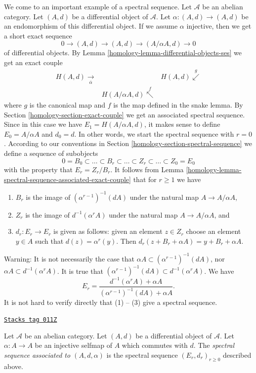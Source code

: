 We come to an important example of a spectral sequence.
Let $\mathcal{A}$ be an abelian category.
Let $(A, d)$ be a differential object of $\mathcal{A}$.
Let $\alpha : (A, d) \to (A, d)$ be an endomorphism of this differential
object. If we assume $\alpha$ injective, then we get a short exact sequence
$$
0 \to (A, d) \to (A, d) \to (A/\alpha A, d) \to 0
$$
of differential objects. By
Lemma \ref{homology-lemma-differential-objects-ses} we get an exact couple
$$
\begin{array}{ccc}H(A, d) \underset{\overline{\alpha}}{\longrightarrow} &  & H(A, d) \overset{g}{\swarrow} \\  & H(A/\alpha A, d) \overset{f}{\nwarrow} & \end{array}
$$
where $g$ is the canonical map and $f$ is the map defined in the snake lemma.
By Section \ref{homology-section-exact-couple} we get an associated spectral sequence.
Since in this case we have $E_1 = H(A/\alpha A, d)$,
it makes sense to define $E_0 = A/\alpha A$ and $d_0 = d$.
In other words, we start the spectral sequence
with $r = 0$. According to our conventions in
Section \ref{homology-section-spectral-sequence} we define a sequence of subobjects
$$
0 = B_0 \subset \ldots \subset B_r \subset \ldots
\subset Z_r \subset \ldots \subset Z_0 = E_0
$$
with the property that $E_r = Z_r/B_r$. It follows from
Lemma \ref{homology-lemma-spectral-sequence-associated-exact-couple}
that for $r \geq 1$ we have
\begin{enumerate}
\item $B_r$ is the image of $(\alpha^{r - 1})^{-1}(d A)$
under the natural map $A \to A/\alpha A$,
\item $Z_r$ is the image of $d^{-1}(\alpha^r A)$
under the natural map $A \to A/\alpha A$, and
\item $d_r : E_r \to E_r$ is given as follows: given an element $z \in Z_r$
choose an element $y \in A$ such that $d(z) = \alpha^r(y)$. Then
$d_r(z + B_r + \alpha A) = y + B_r + \alpha A$.
\end{enumerate}
Warning: It is not necessarily the case that
$\alpha A \subset (\alpha^{r - 1})^{-1}(dA)$, nor
$\alpha A \subset d^{-1}(\alpha^r A)$. It is true that
$(\alpha^{r - 1})^{-1}(dA) \subset d^{-1}(\alpha^r A)$.
We have
$$
E_r
=
\frac{d^{-1}(\alpha^r A) + \alpha A}{(\alpha^{r - 1})^{-1}(dA) + \alpha A}.
$$
It is not hard to verify directly that (1) -- (3) give a spectral sequence.

\begin{definition}
\label{homology-definition-differential-object-selfmap}
\href{https://stacks.math.columbia.edu/tag/011Z}{\texttt{Stacks tag 011Z}}

Let $\mathcal{A}$ be an abelian category.
Let $(A, d)$ be a differential object of $\mathcal{A}$.
Let $\alpha : A \to A$ be an injective selfmap of $A$ which
commutes with $d$. The {\it spectral sequence associated to
$(A, d, \alpha)$} is the spectral sequence
$(E_r, d_r)_{r \geq 0}$ described above.
\end{definition}


